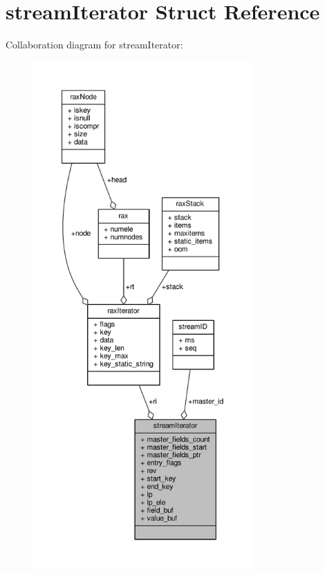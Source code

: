 \hypertarget{structstreamIterator}{}\section{stream\+Iterator Struct Reference}
\label{structstreamIterator}


Collaboration diagram for stream\+Iterator\+:\nopagebreak
\begin{figure}[H]
\begin{center}
\leavevmode
\includegraphics[height=550pt]{structstreamIterator__coll__graph}
\end{center}
\end{figure}
